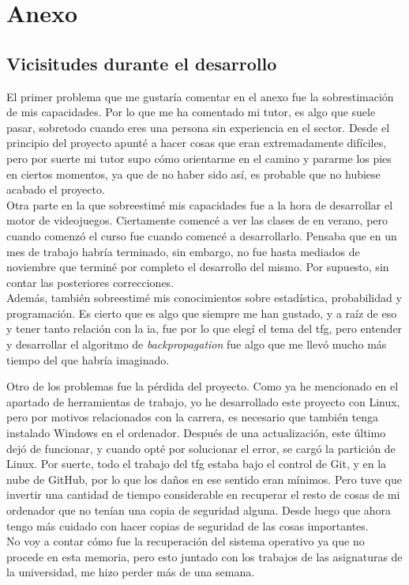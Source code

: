 
\chapter{Anexo}
\section{Vicisitudes durante el desarrollo}
El primer problema que me gustaría comentar en el anexo fue la sobrestimación de mis capacidades. Por lo que me ha comentado mi tutor, es algo que suele pasar, sobretodo cuando eres una persona sin experiencia en el sector. Desde el principio del proyecto apunté a hacer cosas que eran extremadamente difíciles, pero por suerte mi tutor supo cómo orientarme en el camino y pararme los pies en ciertos momentos, ya que de no haber sido así, es probable que no hubiese acabado el proyecto. 
\\
Otra parte en la que sobreestimé mis capacidades fue a la hora de desarrollar el motor de videojuegos. Ciertamente comencé a ver las clases de \cite{CursoMotorC++} en verano, pero cuando comenzó el curso fue cuando comencé a desarrollarlo. Pensaba que en un mes de trabajo habría terminado, sin embargo, no fue hasta mediados de noviembre que terminé por completo el desarrollo del mismo. Por supuesto, sin contar las posteriores correcciones.
\\
Además, también sobreestimé mis conocimientos sobre estadística, probabilidad y programación. Es cierto que es algo que siempre me han gustado, y a raíz de eso y tener tanto relación con la \gls{ia}, fue por lo que elegí el tema del \gls{tfg}, pero entender y desarrollar el algoritmo de \textit{backpropagation} fue algo que me llevó mucho más tiempo del que habría imaginado.

Otro de los problemas fue la pérdida del proyecto. Como ya he mencionado en el apartado de herramientas de trabajo, yo he desarrollado este proyecto con Linux, pero por motivos relacionados con la carrera, es necesario que también tenga instalado Windows en el ordenador. Después de una actualización, este último dejó de funcionar, y cuando opté por solucionar el error, se cargó la partición de Linux. Por suerte, todo el trabajo del \gls{tfg} estaba bajo el control de Git, y en la nube de GitHub, por lo que los daños en ese sentido eran mínimos. Pero tuve que invertir una cantidad de tiempo considerable en recuperar el resto de cosas de mi ordenador que no tenían una copia de seguridad alguna. Desde luego que ahora tengo más cuidado con hacer copias de seguridad de las cosas importantes.
\\
No voy a contar cómo fue la recuperación del sistema operativo ya que no procede en esta memoria, pero esto juntado con los trabajos de las asignaturas de la universidad, me hizo perder más de una semana.

